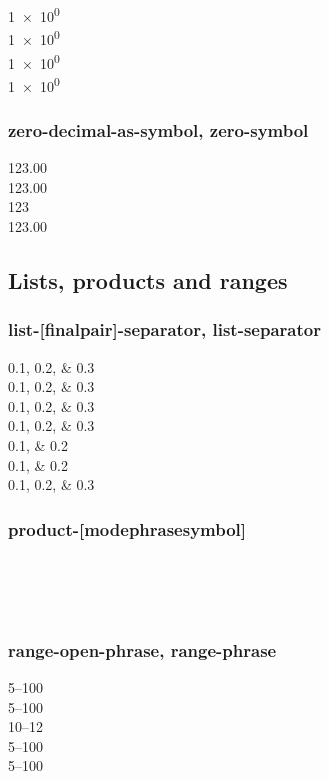 \documentclass{article}
\begin{document}
\num[]{1e0}\\
\num[print-unity-mantissa=false]{1e0}\\ %
\num[print-zero-exponent=true]{1e0}\\
\num[print-unity-mantissa=false, print-zero-exponent=true]{1e0}

\subsubsection{zero-decimal-as-symbol, zero-symbol}
\num{123.00} \\
{
\num{123.00} \\
\num{123} \\
\num[zero-symbol = \text{[{---}]}]{123.00}
}

\subsection{Lists, products and ranges}
\subsubsection{list-[final\textbar pair]-separator, list-separator}
\numlist{0.1;0.2;0.3}\\
\numlist[list-separator = {; }]{0.1;0.2;0.3}\\
\numlist[list-final-separator = {, }]{0.1;0.2;0.3} \\
\numlist[
list-separator = { and },
list-final-separator = { and finally }
]{0.1;0.2;0.3} \\
\numlist{0.1;0.2} \\
\numlist[list-pair-separator = {, and }]{0.1;0.2} \\
\numlist[color=blue]{0.1;0.2;0.3}

\subsubsection{product-[mode\textbar phrase\textbar symbol]}
 \\
 \\
{
%
\\
}

\subsubsection{range-open-phrase, range-phrase}
\numrange{5}{100} \\
\numrange[range-phrase = --]{5}{100}\\
\numrange{10}{12} \\
\numrange[range-open-phrase = {\text{from} }]{5}{100}\\
\numrange[color=blue,range-phrase = --]{5}{100}
\end{document}
